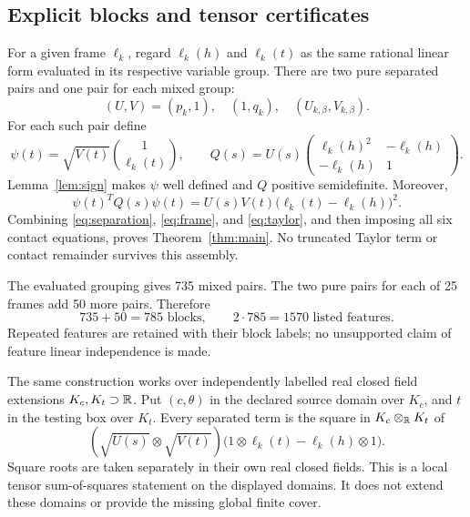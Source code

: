\subsection{Explicit blocks and tensor certificates}

For a given frame $\ell_k$, regard $\ell_k(h)$ and $\ell_k(t)$ as the same
rational linear form evaluated in its respective variable group. There are
two pure separated pairs and one pair for each mixed group:
\begin{equation}
 (U,V)=(p_k,1),\quad(1,q_k),\quad
 (U_{k,\beta},V_{k,\beta}).
 \label{eq:pairs}
\end{equation}
For each such pair define
\begin{equation}
 \psi(t)=\sqrt{V(t)}\binom{1}{\ell_k(t)},\qquad
 Q(s)=U(s)
 \begin{pmatrix}
 \ell_k(h)^2&-\ell_k(h)\\
 -\ell_k(h)&1
 \end{pmatrix}.
 \label{eq:gram}
\end{equation}
Lemma~\ref{lem:sign} makes $\psi$ well defined and $Q$ positive semidefinite.
Moreover,
\begin{equation}
 \psi(t)^TQ(s)\psi(t)
   =U(s)V(t)\bigl(\ell_k(t)-\ell_k(h)\bigr)^2.
 \label{eq:gramidentity}
\end{equation}
Combining \eqref{eq:separation}, \eqref{eq:frame}, and \eqref{eq:taylor}, and
then imposing all six contact equations, proves Theorem~\ref{thm:main}.
No truncated Taylor term or contact remainder survives this assembly.

The evaluated grouping gives 735 mixed pairs. The two pure pairs for each
of 25 frames add 50 more pairs. Therefore
\begin{equation}
 735+50=785\text{ blocks},\qquad 2\cdot785=1570
 \text{ listed features}.
 \label{eq:counts}
\end{equation}
Repeated features are retained with their block labels; no unsupported claim
of feature linear independence is made.

The same construction works over independently labelled real closed field
extensions $K_c,K_t\supset\mathbb R$. Put $(c,\theta)$ in the declared source domain
over $K_c$, and $t$ in the testing box over $K_t$. Every separated term is the
square in $K_c\otimes_\mathbb R K_t$ of
\begin{equation}
 (\sqrt{U(s)}\otimes\sqrt{V(t)})
 \bigl(1\otimes\ell_k(t)-\ell_k(h)\otimes1\bigr).
 \label{eq:tensorsquare}
\end{equation}
Square roots are taken separately in their own real closed fields. This is a
local tensor sum-of-squares statement on the displayed domains. It does not
extend these domains or provide the missing global finite cover.

